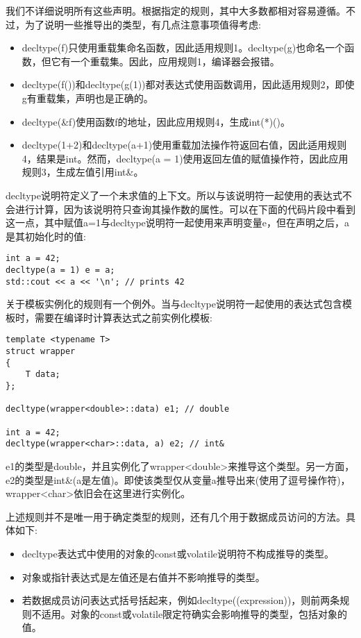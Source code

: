 我们不详细说明所有这些声明。根据指定的规则，其中大多数都相对容易遵循。不过，为了说明一些推导出的类型，有几点注意事项值得考虑:

\begin{itemize}
\item
decltype(f)只使用重载集命名函数，因此适用规则1。decltype(g)也命名一个函数，但它有一个重载集。因此，应用规则1，编译器会报错。

\item
decltype(f())和decltype(g(1))都对表达式使用函数调用，因此适用规则2，即使g有重载集，声明也是正确的。

\item
decltype(\&f)使用函数f的地址，因此应用规则4，生成int(*)()。

\item
decltype(1+2)和decltype(a+1)使用重载加法操作符返回右值，因此适用规则4，结果是int。然而，decltype(a = 1)使用返回左值的赋值操作符，因此应用规则3，生成左值引用int\&。
\end{itemize}

decltype说明符定义了一个未求值的上下文。所以与该说明符一起使用的表达式不会进行计算，因为该说明符只查询其操作数的属性。可以在下面的代码片段中看到这一点，其中赋值a=1与decltype说明符一起使用来声明变量e，但在声明之后，a是其初始化时的值:

\begin{lstlisting}[style=styleCXX]
int a = 42;
decltype(a = 1) e = a;
std::cout << a << '\n'; // prints 42
\end{lstlisting}

关于模板实例化的规则有一个例外。当与decltype说明符一起使用的表达式包含模板时，需要在编译时计算表达式之前实例化模板:

\begin{lstlisting}[style=styleCXX]
template <typename T>
struct wrapper
{
	T data;
};

decltype(wrapper<double>::data) e1; // double

int a = 42;
decltype(wrapper<char>::data, a) e2; // int&
\end{lstlisting}

e1的类型是double，并且实例化了wrapper<double>来推导这个类型。另一方面，e2的类型是int\&(a是左值)。即使该类型仅从变量a推导出来(使用了逗号操作符)，wrapper<char>依旧会在这里进行实例化。

上述规则并不是唯一用于确定类型的规则，还有几个用于数据成员访问的方法。具体如下:

\begin{itemize}
\item
decltype表达式中使用的对象的const或volatile说明符不构成推导的类型。

\item
对象或指针表达式是左值还是右值并不影响推导的类型。

\item
若数据成员访问表达式括号括起来，例如decltype((expression))，则前两条规则不适用。对象的const或volatile限定符确实会影响推导的类型，包括对象的值。
\end{itemize}

